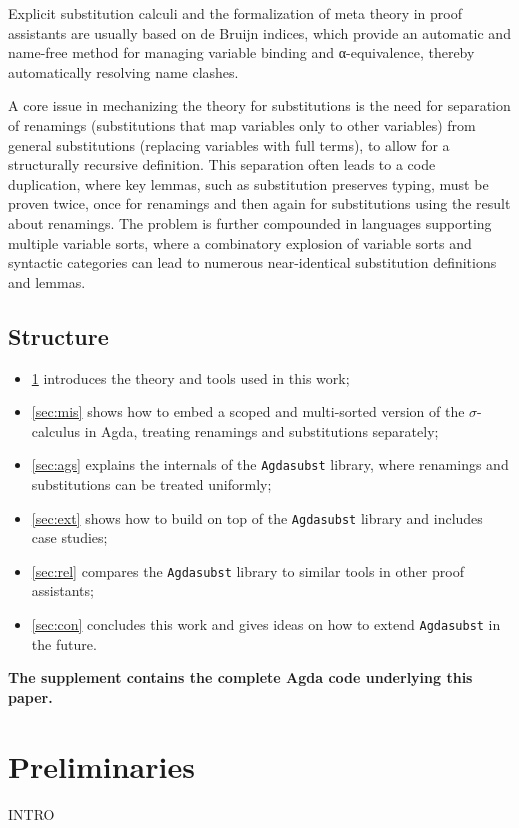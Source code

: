 \documentclass[screen,nonacm]{acmart}
\begin{document}
Explicit substitution calculi and the formalization of meta theory in proof
assistants are usually based on de Bruijn indices, which provide an automatic
and name-free method for managing variable binding and α-equivalence, thereby
automatically resolving name clashes.

A core issue in mechanizing the theory for substitutions is the need for
separation of renamings (substitutions that map variables only to other
variables) from general substitutions (replacing variables with full terms), to
allow for a structurally recursive definition. This separation often leads to a
code duplication, where key lemmas, such as substitution preserves typing, must
be proven twice, once for renamings and then again for substitutions
using the result about renamings. The problem is further compounded in
languages supporting multiple variable sorts, where a combinatory explosion of
variable sorts and syntactic categories can lead to numerous near-identical
substitution definitions and lemmas.



\subsection*{Structure}

\begin{itemize}
      \item \cref{sec:pre} introduces the theory and tools used in this work;
      \item \cref{sec:mis} shows how to embed a scoped and multi-sorted version of the $\sigma$-calculus in Agda, treating renamings and substitutions separately;
      \item \cref{sec:ags} explains the internals of the \texttt{Agdasubst} library, where renamings and substitutions can be treated uniformly;
      \item \cref{sec:ext} shows how to build on top of the \texttt{Agdasubst} library and includes case studies;
      \item \cref{sec:rel} compares the \texttt{Agdasubst} library to similar tools in other proof assistants;
      \item \cref{sec:con} concludes this work and gives ideas on how to extend \texttt{Agdasubst} in the future.
\end{itemize}

\textbf{The supplement contains the complete Agda code underlying this paper.}

\section{Preliminaries}\label{sec:pre}
INTRO
\end{document}
